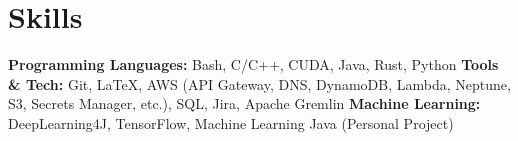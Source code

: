 ﻿
\section{Skills}

\textbf{Programming Languages: } Bash, C/C++, CUDA, Java, Rust, Python
\bigbreak
\textbf{Tools \& Tech: } Git, \LaTeX, AWS (API Gateway, DNS, DynamoDB, Lambda, Neptune, S3, Secrets Manager, etc.), SQL, Jira, Apache Gremlin
\bigbreak
\textbf{Machine Learning: } DeepLearning4J, TensorFlow, Machine Learning Java (Personal Project)